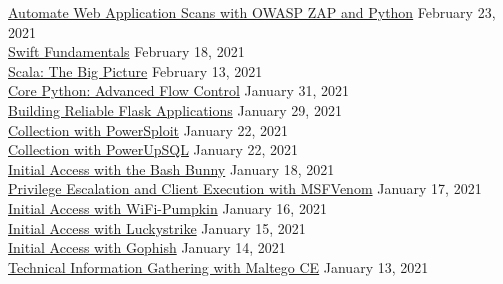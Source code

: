 \documentclass[10pt]{res} %
\begin{document}
\begin{resume}
\href{https://bjdelacruz.dev/files/certificates/pluralsight/Automate_Web_Application_Scans_with_OWASP_ZAP_and_Python.pdf}{\color{blue}Automate Web Application Scans with OWASP ZAP and Python} \hfill February 23, 2021 \\
\href{https://bjdelacruz.dev/files/certificates/pluralsight/Swift_Fundamentals.pdf}{\color{blue}Swift Fundamentals} \hfill February 18, 2021 \\
\href{https://bjdelacruz.dev/files/certificates/pluralsight/Scala_The_Big_Picture.pdf}{\color{blue}Scala: The Big Picture} \hfill February 13, 2021 \\
\href{https://bjdelacruz.dev/files/certificates/pluralsight/6_Core_Python_Advanced_Flow_Control.pdf}{\color{blue}Core Python: Advanced Flow Control} \hfill January 31, 2021 \\
\href{https://bjdelacruz.dev/files/certificates/pluralsight/Building_Reliable_Flask_Applications.pdf}{\color{blue}Building Reliable Flask Applications} \hfill January 29, 2021 \\
\href{https://bjdelacruz.dev/files/certificates/pluralsight/50_Collection_with_PowerSploit.pdf}{\color{blue}Collection with PowerSploit} \hfill January 22, 2021 \\
\href{https://bjdelacruz.dev/files/certificates/pluralsight/51_Collection_with_PowerUpSQL.pdf}{\color{blue}Collection with PowerUpSQL} \hfill January 22, 2021 \\
\href{https://bjdelacruz.dev/files/certificates/pluralsight/19_Initial_Access_with_the_Bash_Bunny.pdf}{\color{blue}Initial Access with the Bash Bunny} \hfill January 18, 2021 \\
\href{https://bjdelacruz.dev/files/certificates/pluralsight/12_Privilege_Escalation_and_Client_Execution_with_MSFVenom.pdf}{\color{blue}Privilege Escalation and Client Execution with MSFVenom} \hfill January 17, 2021 \\
\href{https://bjdelacruz.dev/files/certificates/pluralsight/15_Initial_Access_with_WiFi_Pumpkin.pdf}{\color{blue}Initial Access with WiFi-Pumpkin} \hfill January 16, 2021 \\
\href{https://bjdelacruz.dev/files/certificates/pluralsight/14_Initial_Access_with_Luckystrike.pdf}{\color{blue}Initial Access with Luckystrike} \hfill January 15, 2021 \\
\href{https://bjdelacruz.dev/files/certificates/pluralsight/16_Initial_Access_with_Gophish.pdf}{\color{blue}Initial Access with Gophish} \hfill January 14, 2021 \\
\href{https://bjdelacruz.dev/files/certificates/pluralsight/6_Technical_Information_Gathering_with_Maltego_CE.pdf}{\color{blue}Technical Information Gathering with Maltego CE} \hfill January 13, 2021 \\

\end{resume}
\end{document}
